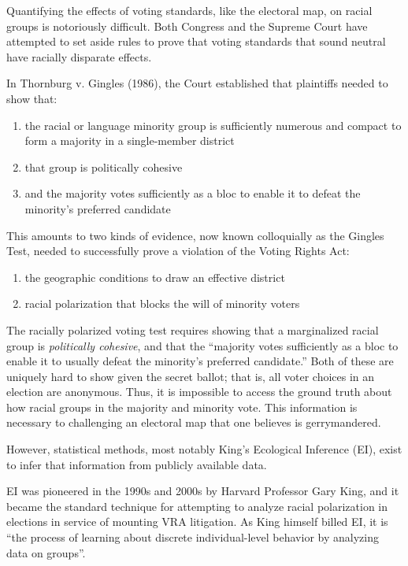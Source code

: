 Quantifying the effects of voting standards, like the electoral map, on racial groups is notoriously difficult. Both Congress and the Supreme Court have attempted to set aside rules to prove that voting standards that sound neutral have racially disparate effects.

In Thornburg v. Gingles (1986)\cite{thornburg}, the Court established that plaintiffs needed to show that:

\begin{enumerate}
 \item the racial or language minority group is sufficiently numerous and compact to form a majority in a single-member district
 \item that group is politically cohesive
 \item and the majority votes sufficiently as a bloc to enable it to defeat the minority’s preferred candidate
\end{enumerate}

This amounts to two kinds of evidence, now known colloquially as the Gingles Test, needed to successfully prove a violation of the Voting Rights Act:

\begin{enumerate}
 \item the geographic conditions to draw an effective district
 \item racial polarization that blocks the will of minority voters
\end{enumerate}

The racially polarized voting test requires showing that a marginalized racial group is \textit{politically cohesive}, and that the “majority votes sufficiently as a bloc to enable it to usually defeat the minority’s preferred candidate.” Both of these are uniquely hard to show given the secret ballot; that is, all voter choices in an election are anonymous. Thus, it is impossible to access the ground truth about how racial groups in the majority and minority vote. This information is necessary to challenging an electoral map that one believes is gerrymandered.

However, statistical methods, most notably King’s Ecological Inference (EI)\cite{king1999}, exist to infer that information from publicly available data.

EI was pioneered in the 1990s and 2000s by Harvard Professor Gary King, and it became the standard technique for attempting to analyze racial polarization in elections in service of mounting VRA litigation. As King himself billed EI, it is “the process of learning about discrete individual-level behavior by analyzing data on groups”\cite{king1999}.

